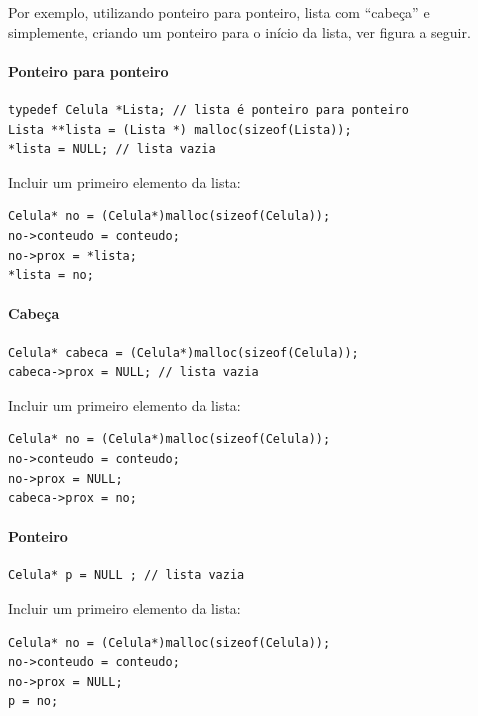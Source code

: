 \documentclass[12pt,a4paper]{article}
\begin{document}
Por exemplo, utilizando ponteiro para ponteiro, lista com ``cabeça'' e
simplemente, criando um ponteiro para o início da lista, ver figura a
seguir.

    \hypertarget{ponteiro-para-ponteiro}{%
\paragraph{Ponteiro para ponteiro}\label{ponteiro-para-ponteiro}}

\begin{verbatim}
typedef Celula *Lista; // lista é ponteiro para ponteiro
Lista **lista = (Lista *) malloc(sizeof(Lista));
*lista = NULL; // lista vazia
\end{verbatim}

Incluir um primeiro elemento da lista:

\begin{verbatim}
Celula* no = (Celula*)malloc(sizeof(Celula));
no->conteudo = conteudo;
no->prox = *lista;
*lista = no;
\end{verbatim}

    \hypertarget{cabeuxe7a}{%
\paragraph{Cabeça}\label{cabeuxe7a}}

\begin{verbatim}
Celula* cabeca = (Celula*)malloc(sizeof(Celula));
cabeca->prox = NULL; // lista vazia
\end{verbatim}

Incluir um primeiro elemento da lista:

\begin{verbatim}
Celula* no = (Celula*)malloc(sizeof(Celula));
no->conteudo = conteudo;
no->prox = NULL;
cabeca->prox = no;
\end{verbatim}

    \hypertarget{ponteiro}{%
\paragraph{Ponteiro}\label{ponteiro}}

\begin{verbatim}
Celula* p = NULL ; // lista vazia
\end{verbatim}

Incluir um primeiro elemento da lista:

\begin{verbatim}
Celula* no = (Celula*)malloc(sizeof(Celula));
no->conteudo = conteudo;
no->prox = NULL;
p = no;
\end{verbatim}
\end{document}
